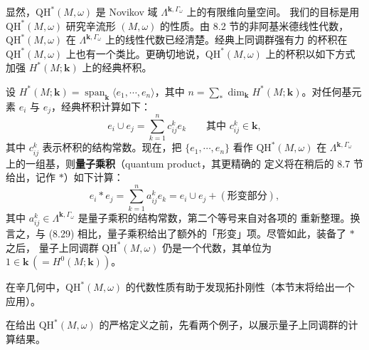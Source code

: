 显然，$\mathrm{QH}^*(M,\omega)$ 是 Novikov 域 $\Lambda^{\mathbf{k},\Gamma_\omega}$ 上的有限维向量空间。
我们的目标是用 $\mathrm{QH}^*(M,\omega)$ 研究辛流形 $(M,\omega)$ 的性质。由 8.2 节的非阿基米德线性代数，
$\mathrm{QH}^*(M,\omega)$ 在 $\Lambda^{\mathbf{k},\Gamma_\omega}$ 上的线性代数已经清楚。经典上同调群强有力
的杯积在 $\mathrm{QH}^*(M,\omega)$ 上也有一个类比。更确切地说，$\mathrm{QH}^*(M,\omega)$ 上的杯积以如下方式
加强 $H^*(M;\mathbf{k})$ 上的经典杯积。

设 $H^*(M;\mathbf{k})=\operatorname{span}_{\mathbf{k}}\langle e_1,\cdots,e_n\rangle$，其中
$n=\sum_*\dim_{\mathbf{k}}H^*(M;\mathbf{k})$。对任何基元素 $e_i$ 与 $e_j$，经典杯积计算如下：
\begin{equation}\tag{8.29}
  e_i\cup e_j=\sum_{k=1}^n c_{ij}^k e_k
    \qquad\text{其中 }c_{ij}^k\in\mathbf{k},
\end{equation}
其中 $c_{ij}^k$ 表示杯积的结构常数。现在，把 $\{e_1,\cdots,e_n\}$ 看作 $\mathrm{QH}^*(M,\omega)$ 在
$\Lambda^{\mathbf{k},\Gamma_\omega}$ 上的一组基，则\textbf{量子乘积}（quantum product，其更精确的
定义将在稍后的 8.7 节给出，记作 $*$）如下计算：
\begin{equation}\tag{8.30}
  e_i*e_j=\sum_{k=1}^n a_{ij}^k e_k
    =e_i\cup e_j+(\text{形变部分}),
\end{equation}
其中 $a_{ij}^k\in\Lambda^{\mathbf{k},\Gamma_\omega}$ 是量子乘积的结构常数，第二个等号来自对各项的
重新整理。换言之，与 (8.29) 相比，量子乘积给出了额外的「形变」项。尽管如此，装备了 $*$ 之后，
量子上同调群 $\mathrm{QH}^*(M,\omega)$ 仍是一个代数，其单位为 $1\in\mathbf{k}\,(=H^0(M;\mathbf{k}))$。

在辛几何中，$\mathrm{QH}^*(M,\omega)$ 的代数性质有助于发现拓扑刚性（本节末将给出一个应用）。

在给出 $\mathrm{QH}^*(M,\omega)$ 的严格定义之前，先看两个例子，以展示量子上同调群的计算结果。


